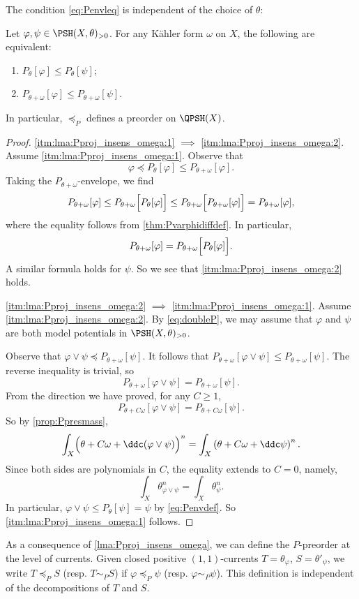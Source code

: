 The condition \eqref{eq:Penvleq} is independent of the choice of $\theta$:
\begin{lemma}\label{lma:Pproj_insens_omega}
    Let $\varphi,\psi\in \PSH(X,\theta)_{>0}$. For any Kähler form $\omega$ on $X$, the following are equivalent:
    \begin{enumerate}
        \item\label{itm:lma:Pproj_insens_omega:1} $P_{\theta}[\varphi]\leq P_{\theta}[\psi]$;
        \item\label{itm:lma:Pproj_insens_omega:2} $P_{\theta+\omega}[\varphi]\leq P_{\theta+\omega}[\psi]$.
    \end{enumerate}
\end{lemma}
In particular, $\preceq_P$ defines a preorder on $\QPSH(X)$.
\begin{proof}
    \ref{itm:lma:Pproj_insens_omega:1} $\implies$ \ref{itm:lma:Pproj_insens_omega:2}. Assume \ref{itm:lma:Pproj_insens_omega:1}. Observe that
    \[
    \varphi\preceq P_{\theta}[\varphi]\leq P_{\theta+\omega}[\varphi].
    \]
    Taking the $P_{\theta+\omega}$-envelope, we find
    \[
    P_{\theta+\omega}[\varphi] \leq P_{\theta+\omega}\Bigl[P_{\theta}[\varphi]\Bigr] \leq P_{\theta+\omega}\Bigl[P_{\theta+\omega}[\varphi]\Bigr]=P_{\theta+\omega}[\varphi],
    \]
    where the equality follows from \cref{thm:Pvarphidiffdef}. In particular,
    \begin{equation}\label{eq:doubleP}
    P_{\theta+\omega}[\varphi]=P_{\theta+\omega}\Bigl[P_{\theta}[\varphi]\Bigr].
    \end{equation}
    A similar formula holds for $\psi$. So we see that \ref{itm:lma:Pproj_insens_omega:2} holds.

    \ref{itm:lma:Pproj_insens_omega:2} $\implies$ \ref{itm:lma:Pproj_insens_omega:1}. Assume \ref{itm:lma:Pproj_insens_omega:2}. By \eqref{eq:doubleP}, we may assume that $\varphi$ and $\psi$ are both model potentials in $\PSH(X,\theta)_{>0}$.

    Observe that $\varphi\lor \psi\preceq P_{\theta+\omega}[\psi]$.
    It follows that $P_{\theta+\omega}[\varphi\lor \psi]\leq P_{\theta+\omega}[\psi]$.
    The reverse inequality is trivial, so
    \[
    P_{\theta+\omega}[\varphi\lor \psi]= P_{\theta+\omega}[\psi].
    \]
    From the direction we have proved, for any $C\geq 1$,
    \[
    P_{\theta+C\omega}[\varphi\lor \psi]= P_{\theta+C\omega}[\psi].
    \]
    So by \cref{prop:Ppresmass},
    \[
    \int_X \Bigl(\theta+C\omega+\ddc(\varphi\lor \psi)\Bigr)^n=\int_X\left(\theta+C\omega+\ddc\psi\right)^n.
    \]
    Since both sides are polynomials in $C$, the equality extends to $C=0$, namely,
    \[
    \int_X \theta_{\varphi\lor \psi}^n=\int_X \theta_{\psi}^n.
    \]
    In particular, $\varphi\lor \psi\leq P_{\theta}[\psi]=\psi$ by \eqref{eq:Penvdef}. So \ref{itm:lma:Pproj_insens_omega:1} follows.
\end{proof}
As a consequence of \cref{lma:Pproj_insens_omega}, we can define the $P$-preorder at the level of currents.
Given closed positive $(1,1)$-currents $T=\theta_{\varphi}$, $S=\theta'_{\psi}$, we write $T\preceq_P S$ (resp. $T\sim_P S$) if $\varphi\preceq_P \psi$ (resp. $\varphi\sim_P \psi$). This definition is independent of the decompositions of $T$ and $S$.

